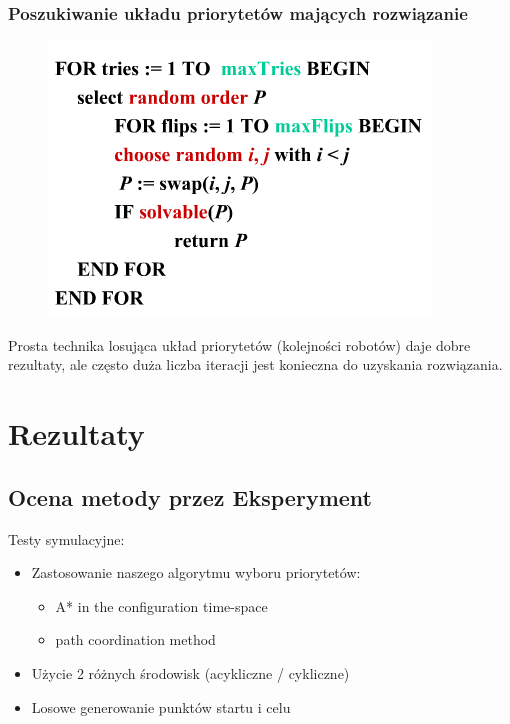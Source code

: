 \subsubsection{Poszukiwanie układu priorytetów mających rozwiązanie}
\begin{figure}[htp]
	\centering
	\includegraphics[width=\textwidth,height=0.6\textheight,keepaspectratio]{img/article1/algorytm}
\end{figure}
Prosta technika losująca układ priorytetów (kolejności robotów) daje dobre rezultaty, ale często duża liczba iteracji jest konieczna do uzyskania rozwiązania.

\section{Rezultaty}
\subsection{Ocena metody przez Eksperyment}
Testy symulacyjne:
\begin{itemize}
	\item Zastosowanie naszego algorytmu wyboru priorytetów:
		\begin{itemize}
			\item A* in the configuration time-space
			\item path coordination method
		\end{itemize}
	\item Użycie 2 różnych środowisk (acykliczne / cykliczne)
	\item Losowe generowanie punktów startu i celu
\end{itemize}

